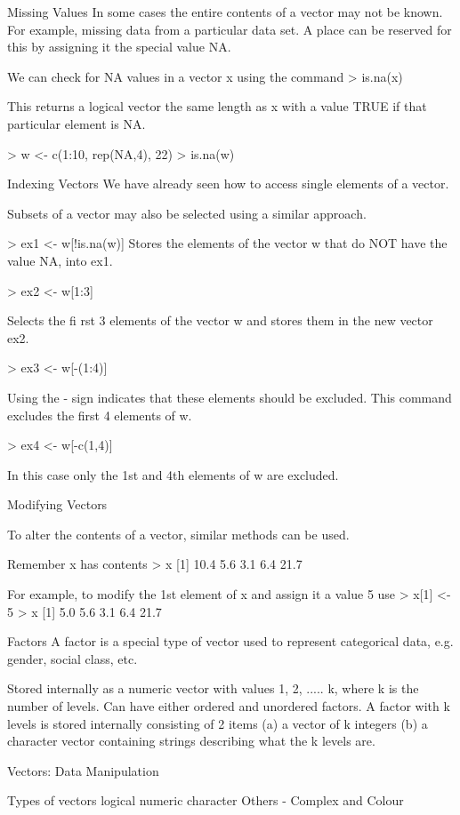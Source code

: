 Missing Values
In some cases the entire contents of a vector may not be known. For example, missing data from a particular data set.
A place can be reserved for this by assigning it the special value NA.

We can check for NA values in a vector x using the command
> is.na(x)

This returns a logical vector the same length as x with a value TRUE if that particular element is NA.

> w <- c(1:10, rep(NA,4), 22)
> is.na(w)

Indexing Vectors
We have already seen how to access single elements of a vector.

Subsets of a vector may also be selected using a similar approach.

  > ex1 <- w[!is.na(w)]
Stores the elements of the vector w that do NOT have the value NA, into ex1.

  > ex2 <- w[1:3]

Selects the fi rst 3 elements of the vector w and stores them in the new vector ex2.

  > ex3 <- w[-(1:4)]

Using the - sign indicates that these elements should be excluded. 
This command excludes the first 4 elements of w.

> ex4 <- w[-c(1,4)]

In this case only the 1st and 4th elements of w are excluded.

Modifying Vectors

To alter the contents of a vector, similar methods can be used.
 
Remember x has contents
> x
[1] 10.4 5.6 3.1 6.4 21.7

For example, to modify the 1st element of x and assign it a value 5 use
> x[1] <- 5
> x
[1] 5.0 5.6 3.1 6.4 21.7

Factors
A factor is a special type of vector used to represent categorical data, e.g. gender, social class, etc.

 Stored internally as a numeric vector with values 1, 2, ..... k, where k is the number of levels.
 Can have either ordered and unordered factors.
 A factor with k levels is stored internally consisting of 2 items
			(a) a vector of k integers
			(b) a character vector containing strings describing what the k levels are.



Vectors: Data Manipulation

Types of vectors
	logical
	numeric
	character
    Others  - Complex and Colour

